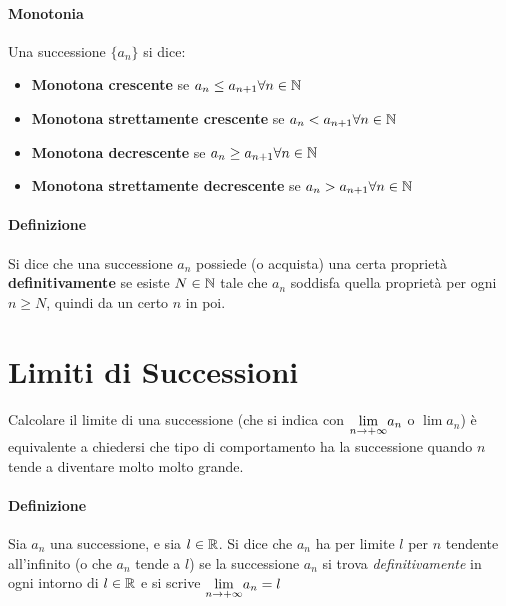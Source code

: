 \documentclass[12pt, a4paper, openany]{book}
\begin{document}
\paragraph*{Monotonia} Una successione $\{a_n\}$ si dice:
\begin{itemize}
	\item \textbf{Monotona crescente} se $a_n\leq a_{n+1} \forall n \in \mathbb{N}$
	\item \textbf{Monotona strettamente crescente} se $a_n < a_{n+1} \forall n \in \mathbb{N}$
	\item \textbf{Monotona decrescente} se $a_n \geq a_{n+1} \forall n\in\mathbb{N}$
	\item \textbf{Monotona strettamente decrescente} se $a_n > a_{n+1} \forall n \in \mathbb{N}$
\end{itemize}

\paragraph*{Definizione} Si dice che una successione {$a_n$} possiede (o acquista) una certa proprietà \textbf{definitivamente} se esiste $N \in \mathbb{N}$ tale che
$a_n$ soddisfa quella proprietà per ogni $n \geq N$, quindi da un certo $n$ in poi.


\section{Limiti di Successioni}
\paragraph*{}Calcolare il limite di una successione (che si indica con $\underset{n \to +\infty}{\lim}a_n$ o $\lim a_n$)
è equivalente a chiedersi che tipo di comportamento ha la successione quando $n$ tende a diventare molto molto grande.

\paragraph*{Definizione} Sia $a_n$ una successione, e sia $l \in \mathbb{R}$.
Si dice che $a_n$ ha per limite $l$ per $n$ tendente all'infinito (o che $a_n$ tende a $l$)
se la successione $a_n$ si trova \emph{definitivamente} in ogni intorno di $l \in \mathbb{R}$
e si scrive $\underset{n \to +\infty}{\lim} a_n = l$
\end{document}
